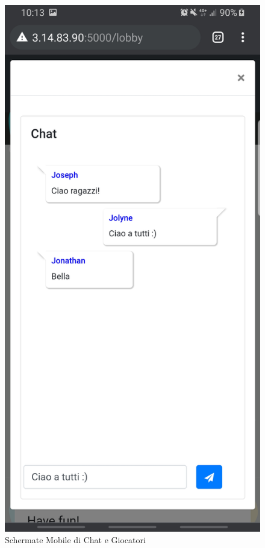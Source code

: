 \begin{figure}[H]
\begin{minipage}[b]{0.2\textwidth}
  \end{minipage}
  \hspace{1cm}
  \begin{minipage}[b]{0.2\textwidth}
    \includegraphics[width=\textwidth]{img/screen/M chat.jpg}
  \end{minipage}
    \caption{Schermate Mobile di Chat e Giocatori}
\end{figure}

